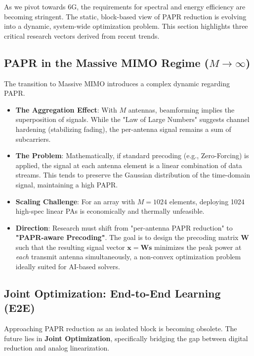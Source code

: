 \documentclass[journal]{IEEEtran}
\begin{document}
As we pivot towards 6G, the requirements for spectral and energy efficiency are becoming stringent. The static, block-based view of PAPR reduction is evolving into a dynamic, system-wide optimization problem. This section highlights three critical research vectors derived from recent trends.

\subsection{PAPR in the Massive MIMO Regime ($M \to \infty$)}
The transition to Massive MIMO introduces a complex dynamic regarding PAPR.

\begin{itemize}
    \item \textbf{The Aggregation Effect}: With $M$ antennas, beamforming implies the superposition of signals. While the "Law of Large Numbers" suggests channel hardening (stabilizing fading), the per-antenna signal remains a sum of subcarriers.
    \item \textbf{The Problem}: Mathematically, if standard precoding (e.g., Zero-Forcing) is applied, the signal at each antenna element is a linear combination of data streams. This tends to preserve the Gaussian distribution of the time-domain signal, maintaining a high PAPR.
    \item \textbf{Scaling Challenge}: For an array with $M=1024$ elements, deploying 1024 high-spec linear PAs is economically and thermally unfeasible.
    \item \textbf{Direction}: Research must shift from "per-antenna PAPR reduction" to \textbf{"PAPR-aware Precoding"}. The goal is to design the precoding matrix $\mathbf{W}$ such that the resulting signal vector $\mathbf{x} = \mathbf{W}\mathbf{s}$ minimizes the peak power at \textit{each} transmit antenna simultaneously, a non-convex optimization problem ideally suited for AI-based solvers.
\end{itemize}

\subsection{Joint Optimization: End-to-End Learning (E2E)}
Approaching PAPR reduction as an isolated block is becoming obsolete. The future lies in \textbf{Joint Optimization}, specifically bridging the gap between digital reduction and analog linearization.
\end{document}
